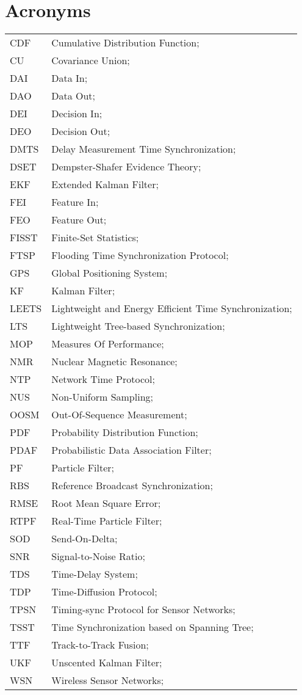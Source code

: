 \section*{Acronyms}
\begin{longtable}{ll}
	CDF			& Cumulative Distribution Function; \\
	CU			& Covariance Union; \\
	DAI			& Data In; \\
	DAO			& Data Out; \\
	DEI			& Decision In; \\
	DEO 		& Decision Out; \\
	DMTS		& Delay Measurement Time Synchronization; \\
	DSET 		& Dempster-Shafer Evidence Theory; \\		
	EKF			& Extended Kalman Filter; \\
	FEI			& Feature In; \\
	FEO			& Feature Out; \\
	FISST		& Finite-Set Statistics; \\
	FTSP		& Flooding Time Synchronization Protocol; \\
	GPS			& Global Positioning System; \\
	KF 			& Kalman Filter; \\
	LEETS		& Lightweight and Energy Efficient Time Synchronization; \\
	LTS			& Lightweight Tree-based Synchronization; \\
	MOP 		& Measures Of Performance; \\
	NMR 		& Nuclear Magnetic Resonance; \\
	NTP			& Network Time Protocol; \\
	NUS 		& Non-Uniform Sampling; \\ 
	OOSM 		& Out-Of-Sequence Measurement; \\
	PDF         & Probability Distribution Function; \\
	PDAF		& Probabilistic Data Association Filter; \\
	PF 			& Particle Filter; \\
	RBS			& Reference Broadcast Synchronization; \\
	RMSE		& Root Mean Square Error; \\
	RTPF		& Real-Time Particle Filter; \\
	SOD			& Send-On-Delta; \\
	SNR			& Signal-to-Noise Ratio; \\
	TDS			& Time-Delay System; \\
	TDP			& Time-Diffusion Protocol; \\
	TPSN		& Timing-sync Protocol for Sensor Networks; \\
	TSST		& Time Synchronization based on Spanning Tree; \\
	TTF 		& Track-to-Track Fusion; \\
	UKF			& Unscented Kalman Filter; \\
	WSN			& Wireless Sensor Networks; \\
\end{longtable}

